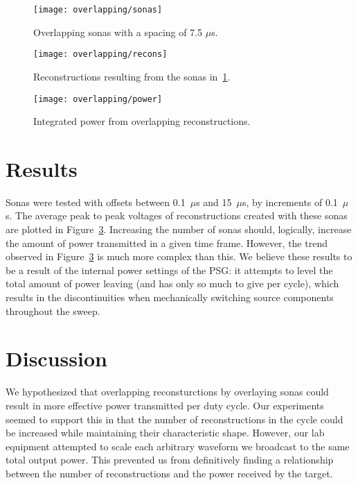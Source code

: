 \begin{figure}[t]
\centering
\texttt{[image: overlapping/sonas]}
\caption[Overlapping sonas]{Overlapping sonas with a spacing of 7.5 $\mu$s.}
\label{fig:overlapping-sonas}
\end{figure}

\begin{figure}[t]
\centering
\texttt{[image: overlapping/recons]}
\caption[Overlapping reconstructions]{Reconstructions resulting from the sonas in~\ref{fig:overlapping-sonas}.}
\label{fig:overlapping-recons}
\end{figure}

\begin{figure}[t]
\centering
\texttt{[image: overlapping/power]}
\caption[Power from overlapping reconstructions]{Integrated power from overlapping reconstructions.}
\label{fig:overlapping-power}
\end{figure}

\section{Results}
\label{sec:overlapping-results}

Sonas were tested with offsets between 0.1~$\mu$s and 15~$\mu$s, by increments of 0.1~$\mu$s. The average peak to peak voltages of reconstructions created with these sonas are plotted in Figure~\ref{fig:overlapping-power}. Increasing the number of sonas should, logically, increase the amount of power transmitted in a given time frame. However, the trend observed in Figure~\ref{fig:overlapping-power} is much more complex than this. We believe these results to be a result of the internal power settings of the PSG: it attempts to level the total amount of power leaving (and has only so much to give per cycle), which results in the discontinuities when mechanically switching source components throughout the sweep.


\section{Discussion}
\label{sec:overlapping-discussion}

We hypothesized that overlapping reconsturctions by overlaying sonas could result in more effective power transmitted per duty cycle. Our experiments seemed to support this in that the number of reconstructions in the cycle could be increased while maintaining their characteristic shape. However, our lab equipment attempted to scale each arbitrary waveform we broadcast to the same total output power. This prevented us from definitively finding a relationship between the number of reconstructions and the power received by the target.
